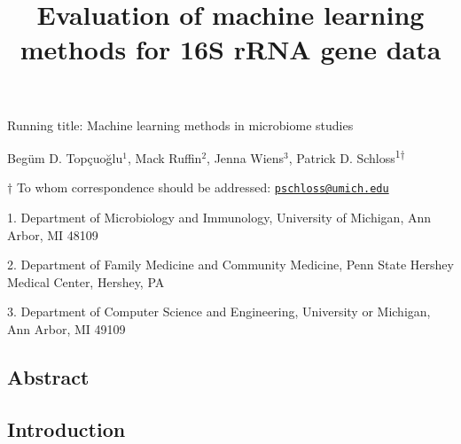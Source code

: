 \documentclass[11pt,]{article}
\title{\textbf{Evaluation of machine learning methods for 16S rRNA gene data}}
\author{}
\date{}
\begin{document}
\maketitle

\vspace{35mm}

Running title: Machine learning methods in microbiome studies

\vspace{35mm}

Begüm D. Topçuoğlu\({^1}\), Mack Ruffin\({^2}\), Jenna Wiens\({^3}\),
Patrick D. Schloss\textsuperscript{1\(\dagger\)}

\vspace{40mm}

\(\dagger\) To whom correspondence should be addressed:
\href{mailto:pschloss@umich.edu}{\nolinkurl{pschloss@umich.edu}}

1. Department of Microbiology and Immunology, University of Michigan,
Ann Arbor, MI 48109

2. Department of Family Medicine and Community Medicine, Penn State
Hershey Medical Center, Hershey, PA

3. Department of Computer Science and Engineering, University or
Michigan, Ann Arbor, MI 49109

\newpage

\linenumbers

\subsection{Abstract}\label{abstract}

\newpage

\subsection{Introduction}\label{introduction}
\end{document}
